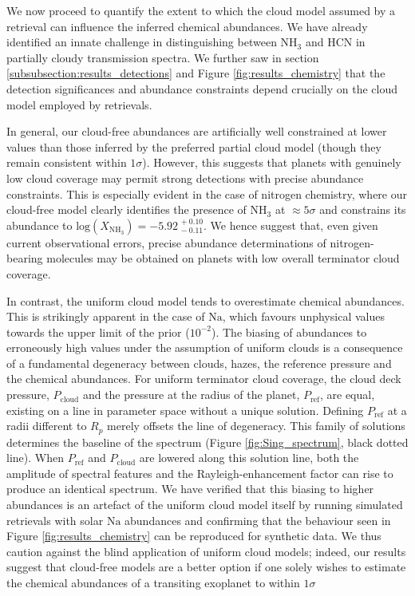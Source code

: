\documentclass[fleqn,usenatbib]{mnras}
\begin{document}
We now proceed to quantify the extent to which the cloud model assumed by a retrieval can influence the inferred chemical abundances. We have already identified an innate challenge in distinguishing between $\mathrm{NH_3}$ and $\mathrm{HCN}$ in partially cloudy transmission spectra. We further saw in section \ref{subsubsection:results_detections} and Figure \ref{fig:results_chemistry} that the detection significances and abundance constraints depend crucially on the cloud model employed by retrievals.

In general, our cloud-free abundances are artificially well constrained at lower values than those inferred by the preferred partial cloud model (though they remain consistent within $1\sigma$). However, this suggests that planets with genuinely low cloud coverage may permit strong detections with precise abundance constraints. This is especially evident in the case of nitrogen chemistry, where our cloud-free model clearly identifies the presence of $\mathrm{NH_3}$ at $\approx5\sigma$ and constrains its abundance to $\mathrm{log}(X_{\mathrm{NH_{3}}}) = -5.92^{\, +0.10}_{\, -0.11}$. We hence suggest that, even given current observational errors, precise abundance determinations of nitrogen-bearing molecules may be obtained on planets with low overall terminator cloud coverage.

In contrast, the uniform cloud model tends to overestimate chemical abundances. This is strikingly apparent in the case of $\mathrm{Na}$, which favours unphysical values towards the upper limit of the prior ($10^{-2}$). The biasing of abundances to erroneously high values under the assumption of uniform clouds is a consequence of a fundamental degeneracy between clouds, hazes, the reference pressure and the chemical abundances. For uniform terminator cloud coverage, the cloud deck pressure, $P_{\mathrm{cloud}}$ and the pressure at the radius of the planet, $P_{\mathrm{ref}}$, are equal, existing on a line in parameter space without a unique solution. Defining $P_{\mathrm{ref}}$ at a radii different to $R_p$ merely offsets the line of degeneracy. This family of solutions determines the baseline of the spectrum (Figure \ref{fig:Sing_spectrum}, black dotted line). When $P_{\mathrm{ref}}$ and $P_{\mathrm{cloud}}$ are lowered along this solution line, both the amplitude of spectral features and the Rayleigh-enhancement factor can rise to produce an identical spectrum. We have verified that this biasing to higher abundances is an artefact of the uniform cloud model itself by running simulated retrievals with solar $\mathrm{Na}$ abundances and confirming that the behaviour seen in Figure \ref{fig:results_chemistry} can be reproduced for synthetic data. We thus caution against the blind application of uniform cloud models; indeed, our results suggest that cloud-free models are a better option if one solely wishes to estimate the chemical abundances of a transiting exoplanet to within $1\sigma$
\end{document}
